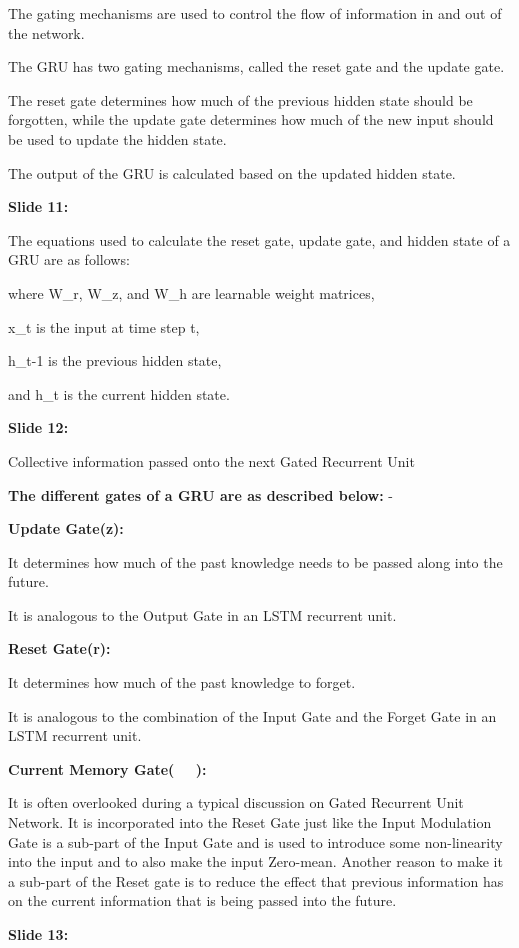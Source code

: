 \documentclass[11pt,a4paper]{article}
\begin{document}
The gating mechanisms are used to control the flow of information in and out of the network.

The GRU has two gating mechanisms, called the reset gate and the update gate.

The reset gate determines how much of the previous hidden state should be forgotten, while the update gate determines how much of the new input should be used to update the hidden state.

The output of the GRU is calculated based on the updated hidden state.

\textbf{Slide 11:}

The equations used to calculate the reset gate, update gate, and hidden state of a GRU are as follows:

where W\_r, W\_z, and W\_h are learnable weight matrices,

x\_t is the input at time step t,

h\_{t-1} is the previous hidden state,

and h\_t is the current hidden state.

\textbf{Slide 12:}

Collective information passed onto the next Gated Recurrent Unit

\textbf{The different gates of a GRU are as described below:} -

\textbf{Update Gate(z):} 

It determines how much of the past knowledge needs to be passed along into the future.

It is analogous to the Output Gate in an LSTM recurrent unit.

\textbf{Reset Gate(r):} 

It determines how much of the past knowledge to forget.

It is analogous to the combination of the Input Gate and the Forget Gate in an LSTM recurrent unit.

\textbf{Current Memory Gate(    ):} 

It is often overlooked during a typical discussion on Gated Recurrent Unit Network. It is incorporated into the Reset Gate just like the Input Modulation Gate is a sub-part of the Input Gate and is used to introduce some non-linearity into the input and to also make the input Zero-mean. Another reason to make it a sub-part of the Reset gate is to reduce the effect that previous information has on the current information that is being passed into the future.

\textbf{Slide 13:}
\end{document}
